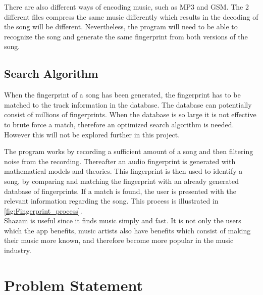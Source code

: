 There are also different ways of encoding music, such as MP3 and GSM. The 2 different files compress the same music differently which results in the decoding of the song will be different. Nevertheless, the program will need to be able to recognize the song and generate the same fingerprint from both versions of the song.

\subsection{Search Algorithm}
When the fingerprint of a song has been generated, the fingerprint has to be matched to the track information in the database. The database can potentially consist of millions of fingerprints. When the database is so large it is not effective to brute force a match, therefore an optimized search algorithm is needed. However this will not be explored further in this project. \cite{haitsma2003highly} 

The program works by recording a sufficient amount of a song and then filtering noise from the recording. 
Thereafter an audio fingerprint is generated with mathematical models and theories. This fingerprint is then used to identify a song, by comparing and matching the fingerprint with an already generated database of fingerprints. If a match is found, the user is presented with the relevant information regarding the song. This process is illustrated in \autoref{fig:Fingerprint_process}. \cite{ShazamDescription}\\

Shazam is useful since it finds music simply and fast. It is not only the users which the app benefits, music artists also have benefits which consist of making their music more known, and therefore become more popular in the music industry. \cite{wang2003industrial} 







\section{Problem Statement}